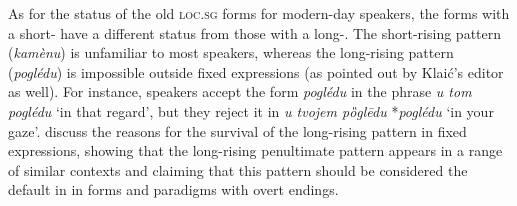 \documentclass[output=paper,nonflat,colorlinks,citecolor=brown,newtxmath]{langsci/langscibook}
\begin{document}
As for the status of the old \textsc{loc}.\textsc{sg} forms for modern-day speakers, the forms with a short- have a different status from those with a long-. The short-rising pattern (\textit{kamènu}) is unfamiliar to most speakers, whereas the long-rising pattern (\textit{poglédu}) is impossible outside fixed expressions (as pointed out by Klaić's editor as well). For instance, speakers accept the form \textit{poglédu} in the phrase \textit{u tom poglédu} `in that regard', but they reject it in \textit{u tvojem pȍglēdu} *\textit{poglédu} `in your gaze'. \citet{SimonovicArsenijevic2015b} discuss the reasons for the survival of the long-rising pattern in fixed expressions, showing that the long-rising penultimate  pattern appears in a range of similar contexts and claiming that this pattern should be considered the default in  in forms and paradigms with overt endings.
\end{document}
